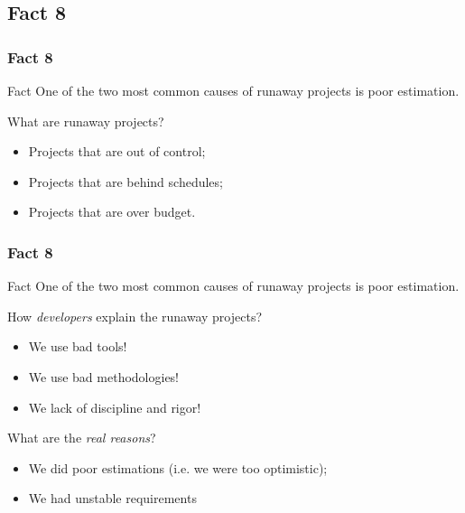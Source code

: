 \documentclass{beamer}
\begin{document}
\subsection{Fact 8}
\begin{frame}
    \frametitle{Fact 8}
    \begin{block}{Fact}
    One of the two most common causes of runaway projects is poor estimation.
    \end{block}
    \pause

    What are runaway projects?
    \begin{itemize}
        \item Projects that are out of control;
        \pause
        \item Projects that are behind schedules;
        \pause
        \item Projects that are over budget.
    \end{itemize}
\end{frame}

\begin{frame}
    \frametitle{Fact 8}
    \begin{block}{Fact}
    One of the two most common causes of runaway projects is poor estimation.
    \end{block}
    \pause

    How \textit{developers} explain the runaway projects?
    \pause
    \begin{itemize}
        \item We use bad tools!
        \pause
        \item We use bad methodologies!
        \pause
        \item We lack of discipline and rigor!
    \end{itemize}
    \bigskip

    \pause
    What are the \textit{real reasons}?
    \begin{itemize}
        \item We did poor estimations (i.e. we were too optimistic);
        \pause
        \item We had unstable requirements
    \end{itemize}
\end{frame}
\end{document}
